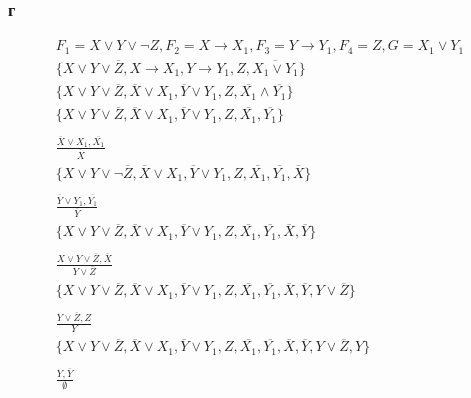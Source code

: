 \documentclass[12pt]{article}
\begin{document}
\subsubsection{г}
\begin{gather*}
  F_1 = X \vee Y \vee \neg Z, F_2 = X \rightarrow X_1, F_3 = Y \rightarrow Y_1, F_4 = Z, G = X_1 \vee Y_1 \\
  \{X \vee Y \vee \overline{Z}, X \rightarrow X_1, Y \rightarrow Y_1, Z, \overline{X_1 \vee Y_1}\} \\
  \{X \vee Y \vee \overline{Z}, \overline{X} \vee X_1, \overline{Y} \vee Y_1, Z, \overline{X_1} \wedge \overline{Y_1}\} \\
  \{X \vee Y \vee \overline{Z}, \overline{X} \vee X_1, \overline{Y} \vee Y_1, Z, \overline{X_1}, \overline{Y_1}\} \\
  \\
  \frac{\overline{X} \vee X_1, \overline{X_1}}{\overline{X}} \\
  \{X \vee Y \vee \neg \overline{Z}, \overline{X} \vee X_1, \overline{Y} \vee Y_1, Z, \overline{X_1}, \overline{Y_1}, \overline{X}\} \\
  \\
  \frac{\overline{Y} \vee Y_1, \overline{Y_1}}{\overline{Y}} \\
  \{X \vee Y \vee \overline{Z}, \overline{X} \vee X_1, \overline{Y} \vee Y_1, Z, \overline{X_1}, \overline{Y_1}, \overline{X}, \overline{Y}\} \\
  \\
  \frac{X \vee Y \vee \overline{Z}, \overline{X}}{Y \vee \overline{Z}} \\
  \{X \vee Y \vee \overline{Z}, \overline{X} \vee X_1, \overline{Y} \vee Y_1, Z, \overline{X_1}, \overline{Y_1}, \overline{X}, \overline{Y}, Y \vee \overline{Z}\} \\
  \\
  \frac{Y \vee \overline{Z}, Z}{Y} \\
  \{X \vee Y \vee \overline{Z}, \overline{X} \vee X_1, \overline{Y} \vee Y_1, Z, \overline{X_1}, \overline{Y_1}, \overline{X}, \overline{Y}, Y \vee \overline{Z}, Y\} \\
  \\
  \frac{Y, \overline{Y}}{\emptyset} \\
\end{gather*}
\end{document}
